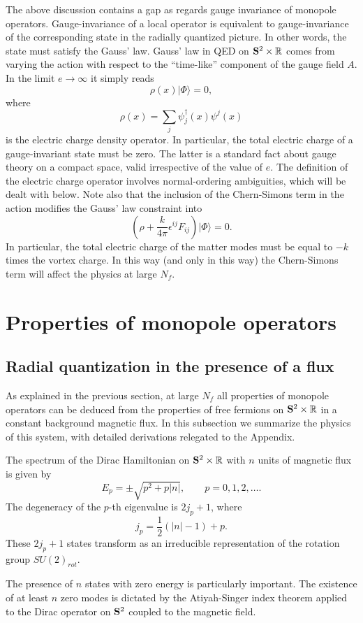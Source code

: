 \documentclass[a4paper,12pt, amsfonts, amssymb]{article}
\newcommand{\RR}{{\mathbb R}}
\newcommand{\ra}{\rightarrow}
\newcommand{\eps}{\epsilon}
\begin{document}
The above discussion contains a gap as regards gauge invariance of
monopole operators. Gauge-invariance of a local operator is equivalent
to gauge-invariance of the corresponding state in the
radially quantized picture.
In other words, the state must satisfy the Gauss' law. Gauss' law
in QED on ${\bf S}^2\times \RR$ comes from varying the action with
respect to the ``time-like'' component of the gauge field $A$. In the
limit $e\ra\infty$ it simply reads
$$
\rho(x) \vert \Phi\rangle =0,
$$
where 
$$\rho(x)=\sum_j\psi_j^\dag(x)\psi^j(x)
$$ 
is the electric charge density operator.
In particular, the total electric charge of a gauge-invariant state must
be zero. The latter is a standard fact about gauge theory on a compact space,
valid irrespective of the value of $e$. The definition of the
electric charge operator involves normal-ordering ambiguities,
which will be dealt with below. Note also that the inclusion of the
Chern-Simons term in the action modifies the Gauss' law constraint into
$$
\left(\rho + \frac{k}{4\pi}\eps^{ij} F_{ij}\right)\vert\Phi\rangle =0.
$$
In particular, the total electric charge of the matter modes must be
equal to $-k$ times the vortex charge. In this way (and only in this way)
the Chern-Simons term will affect the physics at large $N_f$.
 
\section{Properties of monopole operators}
 
\subsection{Radial quantization in the presence of a flux}

As explained in the previous section, at large $N_f$ all properties of
monopole operators can be deduced from the properties of free fermions on
${\bf S}^2\times \RR$ in a constant background magnetic flux. In this 
subsection we summarize the physics of this system, with detailed
derivations relegated to the Appendix.

The spectrum of the Dirac Hamiltonian on ${\bf S}^2\times \RR$ with
$n$ units of magnetic flux is given by
$$
E_p=\pm {\sqrt{p^2+p|n|}},\qquad p=0,1,2,\ldots .
$$
The degeneracy of the $p$-th eigenvalue is $2j_p+1$, where
$$
j_p=\frac{1}{2}(|n|-1)+p.
$$
These $2j_p+1$ states transform as an irreducible representation of
the rotation group $SU(2)_{rot}$.

The presence of $n$ states with zero energy is particularly important. 
The existence of at least $n$ zero modes is dictated by the Atiyah-Singer 
index theorem applied to the Dirac operator on ${\bf S}^2$ coupled to the
magnetic field. 
\end{document}
